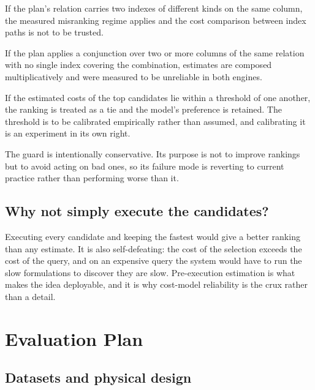 \documentclass[12pt, a4paper]{article}
\begin{document}
\begin{description}[leftmargin=1.6cm, style=nextline, font=\itshape]
\item[Co-located heterogeneous indexes] If the plan's relation carries
two indexes of different kinds on the same column, the measured
misranking regime applies and the cost comparison between index paths is
not to be trusted.

\item[Correlated conjunctive predicates] If the plan applies a
conjunction over two or more columns of the same relation with no single
index covering the combination, estimates are composed multiplicatively
and were measured to be unreliable in both engines.

\item[Narrow cost margins] If the estimated costs of the top candidates
lie within a threshold of one another, the ranking is treated as a tie
and the model's preference is retained. The threshold is to be
calibrated empirically rather than assumed, and calibrating it is an
experiment in its own right.
\end{description}

The guard is intentionally conservative. Its purpose is not to improve
rankings but to avoid acting on bad ones, so its failure mode is
reverting to current practice rather than performing worse than it.

\subsection{Why not simply execute the candidates?}

Executing every candidate and keeping the fastest would give a better
ranking than any estimate. It is also self-defeating: the cost of the
selection exceeds the cost of the query, and on an expensive query the
system would have to run the slow formulations to discover they are
slow. Pre-execution estimation is what makes the idea deployable, and it
is why cost-model reliability is the crux rather than a detail.

\section{Evaluation Plan}
\label{sec:eval}

\subsection{Datasets and physical design}
\end{document}
